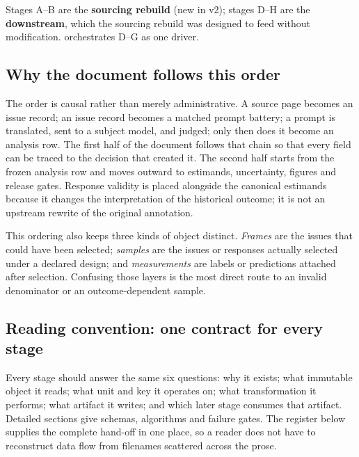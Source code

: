 \documentclass[11pt]{article}
\DeclareRobustCommand{\file}[1]{\texttt{\seqsplit{#1}}}
\begin{document}
Stages A--B are the \textbf{sourcing rebuild} (new in v2); stages D--H are the
\textbf{downstream}, which the sourcing rebuild was designed to feed without
modification. \file{scripts/run\_pilot.py} orchestrates D--G as one driver.

\subsection{Why the document follows this order}

The order is causal rather than merely administrative. A source page becomes
an issue record; an issue record becomes a matched prompt battery; a prompt is
translated, sent to a subject model, and judged; only then does it become an
analysis row. The first half of the document follows that chain so that every
field can be traced to the decision that created it. The second half starts
from the frozen analysis row and moves outward to estimands, uncertainty,
figures and release gates. Response validity is placed alongside the canonical
estimands because it changes the interpretation of the historical outcome; it
is not an upstream rewrite of the original annotation.

This ordering also keeps three kinds of object distinct. \emph{Frames} are the
issues that could have been selected; \emph{samples} are the issues or
responses actually selected under a declared design; and \emph{measurements}
are labels or predictions attached after selection. Confusing those layers is
the most direct route to an invalid denominator or an outcome-dependent sample.

\subsection{Reading convention: one contract for every stage}

Every stage should answer the same six questions: why it exists; what immutable
object it reads; what unit and key it operates on; what transformation it
performs; what artifact it writes; and which later stage consumes that
artifact. Detailed sections give schemas, algorithms and failure gates. The
register below supplies the complete hand-off in one place, so a reader does
not have to reconstruct data flow from filenames scattered across the prose.
\end{document}
